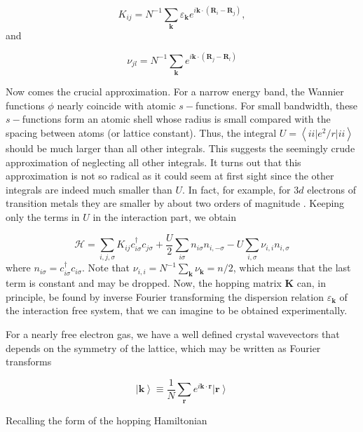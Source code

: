 \begin{equation}\label{eq:hopping_matrix}
K_{ij} = N^{-1} \sum_{\bm k} \varepsilon_{\bm k} e^{i \bm k \cdot ( \bm R_i - \bm R_j )},
\end{equation}
and

\begin{equation}
\nu_{j l} = N^{-1} \sum_{\bm k} e^{i \bm k \cdot ( \bm R_j - \bm R_l) }
\end{equation}

Now comes the crucial approximation.
For a narrow energy band, the Wannier functions $\phi$ nearly coincide with atomic $s-$functions.
For small bandwidth, these $s-$functions form an atomic shell whose radius is small compared with the spacing between atoms (or lattice constant).
Thus, the integral $U = \left\langle i i \big| e^2 / r \big| i i \right\rangle$ should be much larger than all other integrals.
This suggests the seemingly crude approximation of neglecting all other integrals.
It turns out that this approximation is not so radical as it could seem at first sight since the other integrals are indeed much smaller than $U$.
In fact, for example, for $3d$ electrons of transition metals they are smaller by about two orders of magnitude \cite{hubbard_electron_1963}.
Keeping only the terms in $U$ in the interaction part, we obtain

\begin{equation}
\mathcal{H} = \sum_{i, j, \sigma} K_{ij} c_{i\sigma}^\dagger c_{j\sigma} + \frac{U}{2} \sum_{i\sigma} n_{i\sigma} n_{i, -\sigma} - U \sum_{i, \sigma} \nu_{i, i} n_{i, \sigma}
\end{equation}
where $n_{i\sigma} = c_{i\sigma}^\dagger c_{i\sigma}$.
Note that $\nu_{i, i} = N^{-1} \sum_{\bm k} \nu_{\bm k} = n/2$, which means that the last term is constant and may be dropped.
Now, the hopping matrix $\bm K$ can, in principle, be found by inverse Fourier transforming the dispersion relation $\varepsilon_{\bm k}$ of the interaction free system, that we can imagine to be obtained experimentally.

For a nearly free electron gas, we have a well defined crystal wavevectors that depends on the symmetry of the lattice, which may be written as Fourier transforms

\begin{equation}
\left| \bm k \right\rangle \equiv \frac{1}{N} \sum_{\bm r} e^{i\bm k \cdot \bm r} \left| \bm r \right\rangle
\end{equation}

Recalling the form of the hopping Hamiltonian

